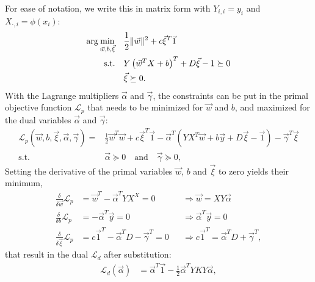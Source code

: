 %
For ease of notation, we write this in matrix form 
with $Y_{i,i} = y_i$ and $X_{\cdot,i} = \phi(x_i)$:
\begin{align}
  \arg\min_{\vec{w}, b, \vec{\xi}} \quad
  & \frac{1}{2}\lVert\vec{w}\rVert^2
  + c\vec{\xi}^T\vec{1}
\\ \label{eq:dsvm_margin_error_const}
  \text{s.t.} \quad &
  Y \left(\vec{w}^T X + b\right)^T + D \vec{\xi} - 1 \succeq 0 
\\&
  \vec{\xi} \succeq 0.
\end{align}
%
With the Lagrange multipliers $\vec{\alpha}$ and $\vec{\gamma}$, the
constraints can be put in the primal objective function $\mathcal{L}_p$ that
needs to be minimized for $\vec{w}$ and $b$, and maximized for the
dual variables $\vec{\alpha}$ and $\vec{\gamma}$:
\begin{align}
  \mathcal{L}_p(\vec{w}, b, \vec{\xi}, \vec{\alpha}, \vec{\gamma})= & 
  \frac{1}{2} \vec{w}^T \vec{w}
  + c\vec{\xi}^T\vec{1}
  - \vec{\alpha}^T \left(
    Y X^T \vec{w} + b \vec{y}  + D \vec{\xi} - \vec{1}
    \right)
  - \vec{\gamma}^T \vec{\xi}
\\
  \text{s.t.} \quad &
  \vec{\alpha} \succeq 0 \quad \text{and} \quad \vec{\gamma} \succeq 0,
  \label{eq:dsvm_slack_const}
\end{align}
%
Setting the derivative of the primal variables $\vec{w}$, $b$ and $\vec{\xi}$ to zero yields their minimum,
\begin{align}
  \frac{\delta}{\delta \vec{w}} \mathcal{L}_p &= 
  \vec{w}^T - \vec{\alpha}^T Y X^X = 0
  &&\Rightarrow \vec{w} = X Y \vec{\alpha}
  \label{eq:dsvm_w_prime}
\\
  \frac{\delta}{\delta b} \mathcal{L}_p &= 
  -\vec{\alpha}^T \vec{y} = 0
  &&\Rightarrow \vec{\alpha}^T \vec{y} = 0
  \label{eq:dsvm_b_prime}
\\
  \frac{\delta}{\delta \vec{\xi}} \mathcal{L}_p &= 
  c\vec{1}^T - \vec{\alpha}^T D - \vec{\gamma}^T = 0
  &&\Rightarrow c\vec{1}^T = \vec{\alpha}^T D + \vec{\gamma}^T,
  \label{eq:dsvm_xi_prime}
\end{align}
%
that result in the dual $\mathcal{L}_d$ after substitution:
\begin{align} %
  \mathcal{L}_d (\vec{\alpha}) & =
  \vec{\alpha}^T \vec{1}
  - \frac{1}{2} \vec{\alpha}^T Y K Y \vec{\alpha},
\end{align}
